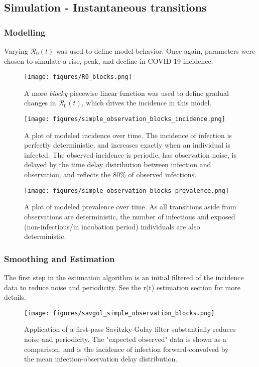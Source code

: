 \documentclass{article}
\newcommand{\nR}{\mathcal{R}}
\begin{document}
\subsection{Simulation - Instantaneous transitions}
\subsubsection{Modelling}

Varying $\nR_0(t)$ was used to define model behavior. Once again, parameters were chosen to simulate a rise, peak, and decline in COVID-19 incidence.

\begin{figure}[h!]
\centering
\texttt{[image: figures/R0\_blocks.png]}
\caption{A more \emph{blocky} piecewise linear function was used to define gradual changes in $\nR_0(t)$, which drives the incidence in this model.}

\end{figure}

\clearpage
\begin{figure}[h!]
\centering
\texttt{[image: figures/simple\_observation\_blocks\_incidence.png]}
\caption{A plot of modeled incidence over time. The incidence of infection is perfectly deterministic, and increases exactly when an individual is infected. The observed incidence is periodic, has observation noise, is delayed by the time delay distribution between infection and observation, and reflects the 80\% of observed infections.}
\end{figure}

\begin{figure}[h!]
\centering
\texttt{[image: figures/simple\_observation\_blocks\_prevalence.png]}
\caption{A plot of modeled prevalence over time. As all transitions aside from observations are deterministic, the number of infectious and exposed (non-infectious/in incubation period) individuals are also deterministic.}
\end{figure}

\subsubsection{Smoothing and Estimation}

The first step in the estimation algorithm is an initial filtered of the incidence data to reduce noise and periodicity. See the r(t) estimation section for more details.

\begin{figure}[h!]
\centering
\texttt{[image: figures/savgol\_simple\_observation\_blocks.png]}
\caption{Application of a first-pass Savitzky-Golay filter substantially reduces noise and periodicity. The "expected observed" data is shown as a comparison, and is the incidence of infection forward-convolved by the mean infection-observation delay distribution.}
\label{SGnoCIBlocks}
\end{figure}
\end{document}
